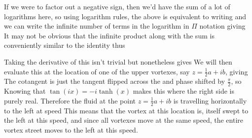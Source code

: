 \documentclass[12pt]{book}
\begin{document}
If we were to factor out a negative sign, then we'd have the sum of a lot of logarithms here, so using logarithm rules, the above is equivalent to writing
and we can write the infinite number of terms in the logarithm in $\Pi$ notation giving
It may not be obvious that the infinite product along with the sum is conveniently similar to the identity
thus 

Taking the derivative of this isn't trivial but nonetheless gives
We will then evaluate this at the location of one of the upper vortexes, say $z=\frac{1}{2}a + ib$, giving
The cotangent is just the tangent flipped across the \xaxis and phase shifted by $\frac{\pi}{2}$, so 
Knowing that $\tan(ix) = -i\tanh(x)$ makes this
where the right side is purely real.  Therefore the fluid at the point $z=\frac{1}{2}a+ib$ is travelling horizontally to the left at speed 
This means that the vortex at this location is, itself swept to the left at this speed, and since all vortexes move at the same speed, the entire vortex street moves to the left at this speed.\\
\end{document}
